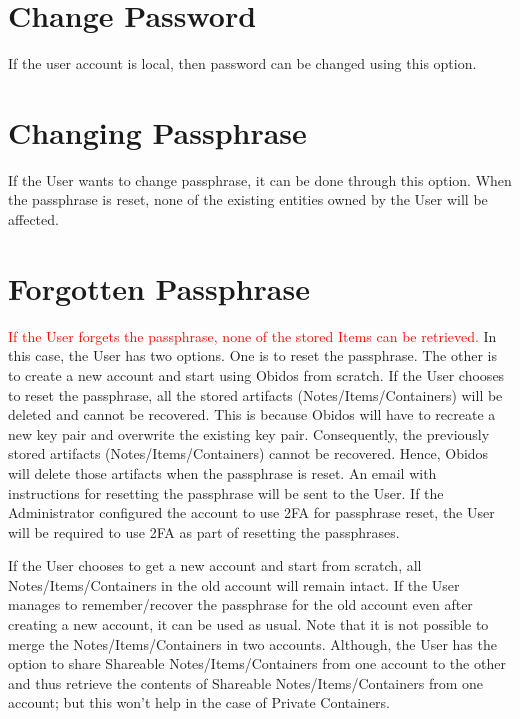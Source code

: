 \section{Change Password}
If the user account is local, then password can be changed using this option.

\section{Changing Passphrase}

If the User wants to change passphrase, it can be done through this option.
When the passphrase is reset, none of the existing entities owned by the User will be affected.

\section{Forgotten Passphrase}

\textcolor{red}{If the User forgets the passphrase, none of the stored Items can be retrieved.}
In this case, the User has two options. One is to reset the passphrase. The other is to create a new account
and start using Obidos from scratch.
If the User chooses to reset the passphrase, all the stored artifacts (Notes/Items/Containers) will be deleted and cannot be recovered. 
This is because Obidos will have to recreate a new key pair and overwrite the existing key pair.
Consequently, the previously stored artifacts (Notes/Items/Containers) cannot be recovered. Hence,
Obidos will delete those artifacts when the passphrase is reset.
An email with instructions for resetting the passphrase will be sent to the User. If the Administrator 
configured the account to use 2FA for passphrase reset, the User will be required to use 2FA as part of resetting
the passphrases.

If the User chooses to get a new account and start from scratch, all Notes/Items/Containers in the old account
will remain intact. If the User manages to remember/recover the passphrase for the old account even after creating a new account, 
it can be used as usual.
Note that it is not possible to merge the Notes/Items/Containers in two accounts.
Although, the User has the option to share Shareable Notes/Items/Containers from one account to the other and 
thus retrieve the contents of Shareable Notes/Items/Containers from one account; but this won't help in the case of Private Containers.


